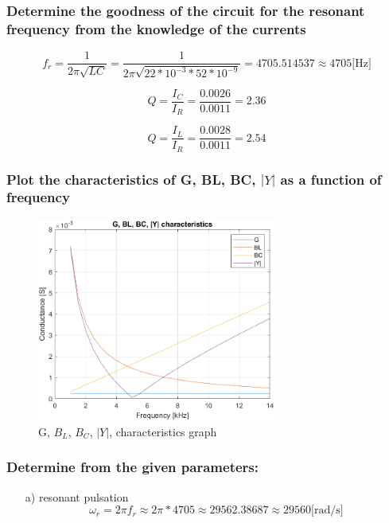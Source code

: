 \documentclass[]{scrartcl}
\begin{document}
\subsubsection{Determine the goodness of the circuit for the resonant frequency from the knowledge of the currents}

\begin{equation}
    f_r=\frac{1}{2\pi\sqrt{LC}}=\frac{1}{2\pi\sqrt{22*10^{-3}*52*10^{-9}}}=4705.514537\approx4705\text{[Hz]}
\end{equation}

\begin{equation}
    Q=\frac{I_C}{I_R}=\frac{0.0026}{0.0011}=2.36
\end{equation}

\begin{equation}
    Q=\frac{I_L}{I_R}=\frac{0.0028}{0.0011}=2.54
\end{equation}
\subsubsection{Plot the characteristics of G, BL, BC, $|Y|$ as a function of frequency}

\begin{figure}[H]
	\centering
	\includegraphics[width=0.7\textwidth]{Pictures/ct_char_06.png}
	\caption{G, $B_L$, $B_C$, $|Y|$, characteristics graph}
	\label{fig:G, BL, BC, Y char}
\end{figure}

\subsubsection{Determine from the given parameters:}

\begin{itemize}
    \item[a)]resonant pulsation
    \begin{equation}
        \omega_r=2\pi f_r\approx2\pi *4705\approx29562.38687\approx29560\text{[rad/s]}
    \end{equation}
\end{itemize}
\end{document}
